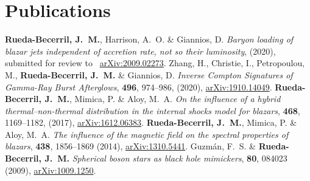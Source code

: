 \section{Publications}

\renewcommand{\refname}{Articles}
\setcounter{num}{0}
\renewcommand{\MyNbOfPub}{5}%
\renewcommand*{\bibliographyitemlabel}{[\arabic{enumiv}]}
\begin{thebibliography}{99}
   \textbf{Rueda-Becerril, J.~M.}, Harrison, A.~O. \& Giannios, D. \textit{Baryon loading of blazar jets independent of accretion rate, not so their luminosity}, %
  (2020), submitted for review to \mnras\ \href{https://arxiv.org/abs/2009.02273}{arXiv:2009.02273}.
   Zhang, H., Christie, I., Petropoulou, M., \textbf{Rueda-Becerril, J.~M.} \& Giannios, D. \textit{Inverse Compton Signatures of Gamma-Ray Burst Afterglows}, \href{https://doi.org/10.1093/mnras/staa1583}{\mnras} \textbf{496}, 974--986, (2020), \href{https://arxiv.org/abs/1910.14049}{arXiv:1910.14049}.
   \textbf{Rueda-Becerril, J.~M.}, Mimica, P. \& Aloy, M.~A. \textit{On the influence of a hybrid thermal--non-thermal distribution in the internal shocks model for blazars}, \href{https://doi.org/10.1093/mnras/stx476}{\mnras} \textbf{468}, 1169--1182, (2017), \href{https://arxiv.org/abs/1612.06383}{arXiv:1612.06383}.
   \textbf{Rueda-Becerril, J.~M.}, Mimica, P. \& Aloy, M.~A. \textit{The influence of the magnetic field on the spectral properties of blazars}, \href{https://doi.org/10.1093/mnras/stt2335}{\mnras} \textbf{438}, 1856--1869 (2014), \href{https://arxiv.org/abs/1310.5441}{arXiv:1310.5441}.
   Guzmán, F.~S. \& \textbf{Rueda-Becerril, J.~M.} \textit{Spherical boson stars as black hole mimickers},  \href{https://doi.org/10.1103/PhysRevD.80.084023}{\prd} \textbf{80}, 084023 (2009), \href{https://arxiv.org/abs/1009.1250}{arXiv:1009.1250}.
\end{thebibliography}

